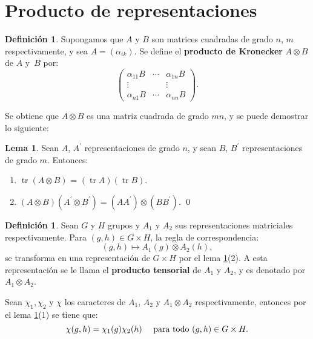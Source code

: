 \documentclass[12pt]{book}
\DeclareMathOperator{\tr}{tr}
\theoremstyle{definition}
\newtheorem{definition}[theorem]{Definición}
\newtheorem{lemma}[theorem]{Lema}
\newcounter{in}
\newcounter{ini}
\begin{document}
\section{Producto de representaciones}
\label{sec:pr}
\begin{definition}
Supongamos que $A$ y $B$ son matrices cuadradas de grado $n$, $m$
respectivamente, y sea $A=(\alpha_{ik})$. Se define el
\textbf{producto de Kronecker} $A \otimes B$ de $A$ y~$B$ por:
\begin{equation}
  \label{eq:65}
    \begin{pmatrix}
    \alpha_{11}B & \cdots & \alpha_{1n}B \\ 
    \vdots &  & \vdots \\
    \alpha_{n1}B & \cdots & \alpha_{nn}B
  \end{pmatrix}.
\end{equation}
\end{definition}
Se obtiene que $A \otimes B$ es una matriz cuadrada de grado $mn$, y se
puede demostrar lo siguiente:
\begin{lemma}
  \label{l6_1}
  Sean $A$, $A^{'}$ representaciones de grado $n$, y sean $B$, $B^{'}$
  representaciones de grado $m$. Entonces:
  \begin{enumerate}
  \item $\tr(A \otimes B)$ = $(\tr A)(\tr B)$.
  \item $(A \otimes B)(A^{'} \otimes B^{'}) = (AA^{'}) \otimes (BB^{'})$. \qed
  \end{enumerate}
\end{lemma}
\begin{definition}
Sean $G$ y $H$ grupos y $A_{1}$ y $A_{2}$ sus representaciones matriciales respectivamente. Para $(g,h) \in G \times H$, la regla de correspondencia:
\begin{equation*}
  (g, h) \mapsto A_{1}(g) \otimes A_{2}(h),
\end{equation*}
se transforma en una representación de $G \times H$ por el lema \ref{l6_1}(2). A esta representación se
le llama el \textbf{producto tensorial} de $A_{1}$ y $A_{2}$, y es denotado por
$A_{1} \otimes A_{2}$.
\end{definition}
Sean $\chi_{1}, \chi_2$ y $\chi$ los caracteres de
$A_{1}$, $A_{2}$ y $A_{1} \otimes A_{2}$ respectivamente, entonces por el lema \ref{l6_1}(1) se tiene que:
\begin{equation*}
  \chi (g,h) = \chi_{1}(g) \chi_{2}(h) \quad \textup{ para todo } (g,h) \in G \times H.
\end{equation*}
\end{document}
